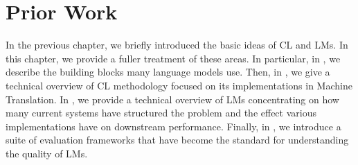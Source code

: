 \chapter{Prior Work}
\label{chap:prior}
In the previous chapter, we briefly introduced the basic ideas of CL and LMs. In this chapter, we provide a fuller treatment of these areas. In particular, in , we describe the building blocks many language models use. Then, in , we give a technical overview of CL methodology focused on its implementations in Machine Translation. In , we provide a technical overview of LMs concentrating on how many current systems have structured the problem and the effect various implementations have on downstream performance.  Finally, in , we introduce a suite of evaluation frameworks that have become the standard for understanding the quality of LMs.



